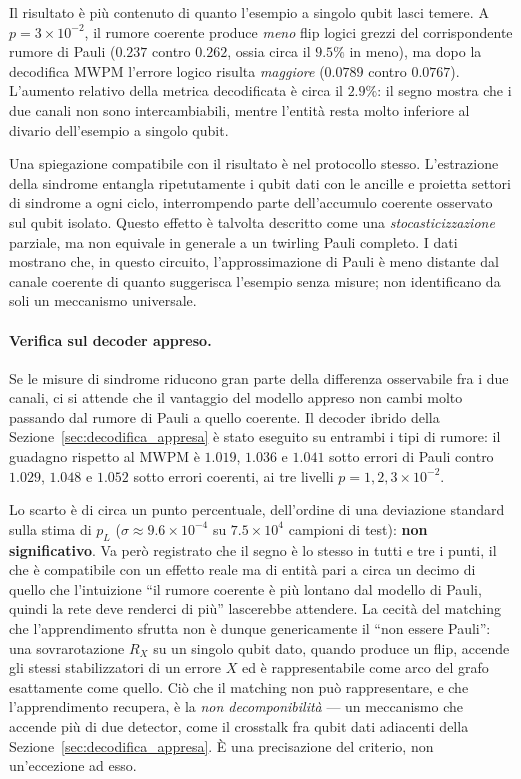 \begin{onehalfspace}
Il risultato è più contenuto di quanto l'esempio a singolo qubit lasci temere. A $p = 3\times10^{-2}$, il rumore coerente produce \emph{meno} flip logici grezzi del corrispondente rumore di Pauli ($0.237$ contro $0.262$, ossia circa il $9.5\%$ in meno), ma dopo la decodifica \ac{MWPM} l'errore logico risulta \emph{maggiore} ($0.0789$ contro $0.0767$). L'aumento relativo della metrica decodificata è circa il $2.9\%$: il segno mostra che i due canali non sono intercambiabili, mentre l'entità resta molto inferiore al divario dell'esempio a singolo qubit.

Una spiegazione compatibile con il risultato è nel protocollo stesso. L'estrazione della sindrome entangla ripetutamente i qubit dati con le ancille e proietta settori di sindrome a ogni ciclo, interrompendo parte dell'accumulo coerente osservato sul qubit isolato. Questo effetto è talvolta descritto come una \emph{stocasticizzazione} parziale, ma non equivale in generale a un twirling Pauli completo. I dati mostrano che, in questo circuito, l'approssimazione di Pauli è meno distante dal canale coerente di quanto suggerisca l'esempio senza misure; non identificano da soli un meccanismo universale.

\paragraph{Verifica sul decoder appreso.}
Se le misure di sindrome riducono gran parte della differenza osservabile fra i due canali, ci si attende che il vantaggio del modello appreso non cambi molto passando dal rumore di Pauli a quello coerente. Il decoder ibrido della Sezione~\ref{sec:decodifica_appresa} è stato eseguito su entrambi i tipi di rumore: il guadagno rispetto al \ac{MWPM} è $1.019$, $1.036$ e $1.041$ sotto errori di Pauli contro $1.029$, $1.048$ e $1.052$ sotto errori coerenti, ai tre livelli $p = 1, 2, 3\times10^{-2}$.

Lo scarto è di circa un punto percentuale, dell'ordine di una deviazione standard sulla stima di $p_L$ ($\sigma \approx 9.6\times10^{-4}$ su $7.5\times10^4$ campioni di test): \textbf{non significativo}. Va però registrato che il segno è lo stesso in tutti e tre i punti, il che è compatibile con un effetto reale ma di entità pari a circa un decimo di quello che l'intuizione ``il rumore coerente è più lontano dal modello di Pauli, quindi la rete deve renderci di più'' lascerebbe attendere. La cecità del matching che l'apprendimento sfrutta non è dunque genericamente il ``non essere Pauli'': una sovrarotazione $R_X$ su un singolo qubit dato, quando produce un flip, accende gli stessi stabilizzatori di un errore $X$ ed è rappresentabile come arco del grafo esattamente come quello. Ciò che il matching non può rappresentare, e che l'apprendimento recupera, è la \emph{non decomponibilità} --- un meccanismo che accende più di due detector, come il crosstalk fra qubit dati adiacenti della Sezione~\ref{sec:decodifica_appresa}. È una precisazione del criterio, non un'eccezione ad esso.


\end{onehalfspace}
